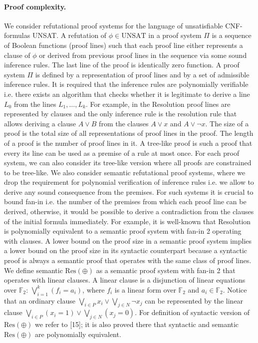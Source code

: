 \documentclass[10pt,a4paper]{article}
\begin{document}
\paragraph{Proof complexity.} We consider refutational proof systems for the language of unsatisfiable CNF-formulas UNSAT. A refutation of $\phi\in\mathrm{UNSAT}$ in a proof system $\Pi$ is a sequence of Boolean functions (proof lines) such that each proof line either represents a clause of $\phi$ or derived from previous proof lines in the sequence via some sound inference rules. The last line of the proof is identically zero function. A proof system $\Pi$ is defined by a representation of proof lines and by a set of admissible inference rules. It is required that the inference rules are polynomially verifiable i.e. there exists an algorithm that checks whether it is legitimate to derive a line $L_0$ from the lines $L_1,\ldots,L_k$.
For example, in the Resolution proof lines are represented by clauses and the only inference rule is the resolution rule that allows deriving a clause $A\vee B$ from the clauses $A\vee x$ and $A\vee\neg x$.
The size of a proof is the total size of all representations of proof lines in the proof. The length of a proof is the number of proof lines in it.
A tree-like proof is such a proof that every its line can be used as a premise of a rule at most once. For each proof system, we can also consider its tree-like version where all proofs are constrained to be tree-like.
We also consider semantic refutational proof systems, where we drop the requirement for polynomial verification of inference rules i.e. we allow to derive any sound consequence from the premises. For such systems it is crucial to bound fan-in i.e. the number of the premises from which each proof line can be derived, otherwise, it would be possible to derive a contradiction from the clauses of the initial formula immediately. For example, it is well-known that Resolution is polynomially equivalent to a semantic proof system with fan-in 2 operating with clauses.
A lower bound on the proof size in a semantic proof system implies a lower bound on the proof size in its syntactic counterpart because a syntactic proof is always a semantic proof that operates with the same class of proof lines.
We define semantic $\mathrm{Res}(\oplus)$ as a semantic proof system with fan-in 2 that operates with linear clauses. A linear clause is a disjunction of linear equations over $\mathbb F_2$: $\bigvee_{i=1}^k(f_i=a_i)$, where $f_i$ is a linear form over $\mathbb F_2$ and $a_i\in\mathbb F_2$. Notice that an ordinary clause $\bigvee_{i\in P}x_i\vee\bigvee_{j\in N}\neg x_j$ can be represented by the linear clause $\bigvee_{i\in P}(x_i=1)\vee\bigvee_{j\in N}(x_j=0)$. For definition of syntactic version of $\mathrm{Res}(\oplus)$ we refer to [15]; it is also proved there that syntactic and semantic $\mathrm{Res}(\oplus)$ are polynomially equivalent.
\end{document}
